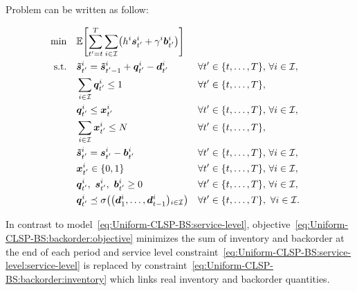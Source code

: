 Problem can be written as follow:

\begin{subequations}\label{eq:Uniform-CLSP-BS:backorder}
  \begin{align}
    \min\quad & \rlap{$\ds \espe\sqbracket{\sum_{t'=t}^{\horizon} \sum_{i\in\REF} \bracket{\holding^i\va\inventory_{t'}^i + \backorder^i\va\backlog_{t'}^i}}$}
    \label{eq:Uniform-CLSP-BS:backorder:objective}
    \\
    \st\quad & \ds \va\level_{t'}^i = \va\level_{t'-1}^i + \va\quantity_{t'}^i - \va\demand_{t'}^i && \forall t'\in\range[t]{\horizon},\, \forall i\in\REF,
    \label{eq:Uniform-CLSP-BS:backorder:inventory-dynamic}
    \\
    & \ds \sum_{i\in\REF} \va\quantity_{t'}^i \le 1 && \forall t'\in\range[t]{\horizon},
    \label{eq:Uniform-CLSP-BS:backorder:capacity}
    \\
    & \ds \va\quantity_{t'}^i \le \va\setup_{t'}^i && \forall t'\in\range[t]{\horizon},\, \forall i\in\REF,
    \label{eq:Uniform-CLSP-BS:backorder:big-M}
    \\
    & \ds \sum_{i\in\REF} \va\setup_{t'}^i \le \nbsetups && \forall t'\in\range[t]{\horizon},
    \label{eq:Uniform-CLSP-BS:backorder:setups}
    \\
    & \ds \va\level_{t'}^i = \va\inventory_{t'}^i - \va\backlog_{t'}^i && \forall t'\in\range[t]{\horizon},\, \forall i\in\REF,
    \label{eq:Uniform-CLSP-BS:backorder:inventory}
    \\
    & \ds \va\setup_{t'}^i \in \crbracket{0,1} && \forall t'\in\range[t]{\horizon},\, \forall i\in\REF,
    \label{eq:Uniform-CLSP-BS:backorder:binary}
    \\
    & \ds \va\quantity_{t'}^i,\ \va\inventory_{t'}^i,\ \va\backlog_{t'}^i \ge 0 && \forall t'\in\range[t]{\horizon},\, \forall i\in\REF,
    \label{eq:Uniform-CLSP-BS:backorder:positity}
    \\
    & \ds \va\quantity_{t'}^i \preceq \Sfield{\bracket{\va\demand_1^i,\ldots,\va\demand_{t-1}^i}_{i\in\REF}} && \forall t'\in\range[t]{\horizon},\ \forall i\in\REF.
    \label{eq:Uniform-CLSP-BS:backorder:measurability}
  \end{align}
\end{subequations}

In contrast to model~\eqref{eq:Uniform-CLSP-BS:service-level}, objective~\eqref{eq:Uniform-CLSP-BS:backorder:objective} minimizes the sum of inventory and backorder at the end of each period and service level constraint~\eqref{eq:Uniform-CLSP-BS:service-level:service-level} is replaced by constraint~\eqref{eq:Uniform-CLSP-BS:backorder:inventory} which links real inventory and backorder quantities.


